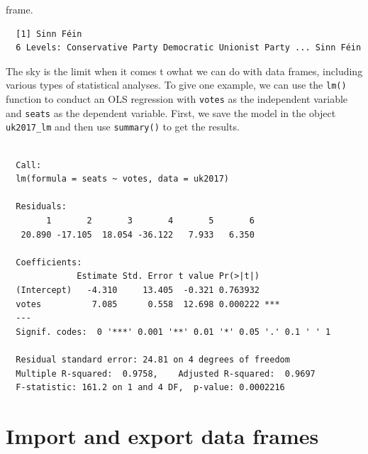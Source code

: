 \documentclass[12pt,oneside]{reedthesis}
\theoremstyle{definition}
\theoremstyle{definition}
\theoremstyle{definition}
\theoremstyle{remark}
\begin{document}
  frame.
  \begin{Shaded}
  \begin{Highlighting}[]
  \OperatorTok{$}\NormalTok{party[uk2017}\OperatorTok{$}\OperatorTok{==}\StringTok{ }\OperatorTok{$}\NormalTok{votes)]}
  \end{Highlighting}
  \end{Shaded}
  \begin{verbatim}
  [1] Sinn Féin
  6 Levels: Conservative Party Democratic Unionist Party ... Sinn Féin
  \end{verbatim}
  The sky is the limit when it comes t owhat we can do with data frames,
  including various types of statistical analyses. To give one example, we
  can use the \texttt{lm()} function to conduct an OLS regression with
  \texttt{votes} as the independent variable and \texttt{seats} as the
  dependent variable. First, we save the model in the object
  \texttt{uk2017\_lm} and then use \texttt{summary()} to get the results.
  \begin{Shaded}
  \begin{Highlighting}[]
  \StringTok{ }\OperatorTok{~}\StringTok{ }
  
  \end{Highlighting}
  \end{Shaded}
  \begin{verbatim}
  
  Call:
  lm(formula = seats ~ votes, data = uk2017)
  
  Residuals:
        1       2       3       4       5       6 
   20.890 -17.105  18.054 -36.122   7.933   6.350 
  
  Coefficients:
              Estimate Std. Error t value Pr(>|t|)    
  (Intercept)   -4.310     13.405  -0.321 0.763932    
  votes          7.085      0.558  12.698 0.000222 ***
  ---
  Signif. codes:  0 '***' 0.001 '**' 0.01 '*' 0.05 '.' 0.1 ' ' 1
  
  Residual standard error: 24.81 on 4 degrees of freedom
  Multiple R-squared:  0.9758,    Adjusted R-squared:  0.9697 
  F-statistic: 161.2 on 1 and 4 DF,  p-value: 0.0002216
  \end{verbatim}
  \section{Import and export data
  frames}\label{import-and-export-data-frames}
  
\end{document}

